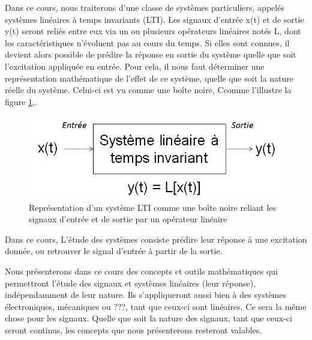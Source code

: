 \documentclass[]{book}
\begin{document}
	Dans ce cours, nous traiterons d'une classe de systèmes particuliers, appelés systèmes linéaires à temps invariants (LTI).  Les signaux d'entrée x(t) et de sortie y(t) seront reliés entre eux via un ou plusieurs opérateurs linéaires notés L, dont les caractéristiques n'évoluent pas au cours du temps. Si elles sont connues, il devient alors possible de prédire la réponse en sortie du système quelle que soit l'excitation appliquée en entrée. Pour cela, il nous faut déterminer une représentation mathématique de l'effet de ce système, quelle que soit la nature réelle du système. Celui-ci est vu comme une boîte noire, Ccomme l'illustre la figure \ref{Fig:LTI},.

	\begin{figure}[h!]
		\centering
		\includegraphics[scale=0.5]{images/LTI.jpg} 
		\caption{Représentation d'un système LTI comme une boîte noire reliant les signaux d'entrée et de sortie par un opérateur linéaire}	
		\label{Fig:LTI}
	\end{figure}
	
	Dans ce cours, L'étude des systèmes consiste prédire leur réponse à une excitation donnée, ou retrouver le signal d'entrée à partir de la sortie. 
	
	Nous présenterons dans ce cours des concepts et outils mathématiques qui permettront l'étude des signaux et systèmes linéaires (leur réponse), indépendamment de leur nature. Ils s'appliqueront aussi bien à des systèmes électroniques, mécaniques ou ???, tant que ceux-ci sont linéaires. Ce sera la même chose pour les signaux. Quelle que soit la nature des signaux, tant que ceux-ci seront continus, les concepts que nous présenterons resteront valables.
	
	
\end{document}
